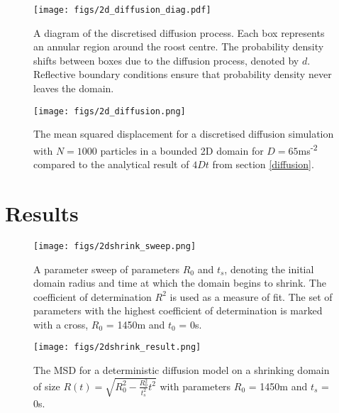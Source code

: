   \begin{figure}
  \centering
      \texttt{[image: figs/2d\_diffusion\_diag.pdf]}
      \caption{A diagram of the discretised diffusion process. Each box represents an annular region around the roost centre. The probability density shifts between boxes due to the diffusion process, denoted by $d$. Reflective boundary conditions ensure that probability density never leaves the domain.}
  \label{fig:2d_diffusion_diag}
  \end{figure}

\begin{figure}
\centering
    \texttt{[image: figs/2d\_diffusion.png]}
    \caption{The mean squared displacement for a discretised diffusion simulation with $N=1000$ particles in a bounded 2D domain for $D=65$ms\textsuperscript{-2} compared to the analytical result of $4Dt$ from section \ref{diffusion}.}
\label{fig:2d_diffusion}
\end{figure}
%
\section{Results}
%

\begin{figure}
\centering
    \texttt{[image: figs/2dshrink\_sweep.png]}
    \caption{A parameter sweep of parameters $R_0$ and $t_s$, denoting the initial domain radius and time at which the domain begins to shrink. The coefficient of determination $R^2$ is used as a measure of fit. The set of parameters with the highest coefficient of determination is marked with a cross, $R_0$ = 1450m and $t_0$ = 0s.}
\label{fig:2dshrink_sweep}
\end{figure}

\begin{figure}
\centering
    \texttt{[image: figs/2dshrink\_result.png]}
    \caption{
    The MSD for a deterministic diffusion model on a shrinking domain of size $R(t) = \sqrt{R_0^2 - \frac{R_0^2}{t_s^2} t^2}$ with parameters $R_0$ = 1450m and $t_s$ = 0s.}
\label{fig:2dshrink_result}
\end{figure}
